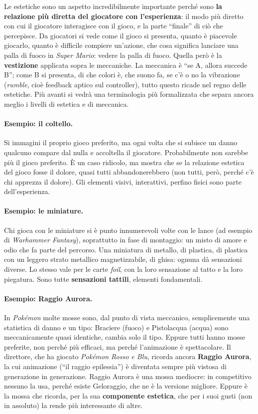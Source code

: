 Le estetiche sono un aspetto incredibilmente importante perché sono
\textbf{la relazione più diretta del giocatore con l'esperienza}: il modo più
diretto con cui il giocatore interagisce con il gioco, e la parte ``finale'' di
ciò che percepisce. Da giocatori si vede come il gioco si presenta, quanto è
piacevole giocarlo, quanto è difficile compiere un'azione, che cosa significa
lanciare una palla di fuoco in \emph{Super Mario}: vedere la palla di fuoco.
Quella però è la \textbf{vestizione} applicata sopra le meccaniche. La
meccanica è ``se A, allora succede B''; come B si presenta, di che colori è,
che suono fa, se c'è o no la vibrazione (\emph{rumble}, cioè feedback aptico
sul controller), tutto questo ricade nel regno delle estetiche. Più avanti si
vedrà una terminologia più formalizzata che separa ancora meglio i livelli di
estetica e di meccanica.

\paragraph{Esempio: il coltello.} Si immagini il proprio gioco preferito, ma
ogni volta che si subisce un danno qualcuno compare dal nulla e accoltella il
giocatore. Probabilmente non sarebbe più il gioco preferito. È un caso
ridicolo, ma mostra che se la relazione estetica del gioco fosse il dolore,
quasi tutti abbandonerebbero (non tutti, però, perché c'è chi apprezza il
dolore). Gli elementi visivi, interattivi, perfino fisici sono parte
dell'esperienza.

\paragraph{Esempio: le miniature.} Chi gioca con le miniature si è punto
innumerevoli volte con le lance (ad esempio di \emph{Warhammer Fantasy}),
soprattutto in fase di montaggio: un misto di amore e odio che fa parte del
percorso. Una miniatura di metallo, di plastica, di plastica con un leggero
strato metallico magnetizzabile, di ghisa: ognuna dà sensazioni diverse.
Lo stesso vale per le carte \emph{foil}, con la loro sensazione al tatto e la
loro piegatura. Sono tutte \textbf{sensazioni tattili}, elementi fondamentali.

\paragraph{Esempio: Raggio Aurora.} In \emph{Pokémon} molte mosse sono, dal
punto di vista meccanico, semplicemente una statistica di danno e un tipo:
Braciere (fuoco) e Pistolacqua (acqua) sono meccanicamente quasi identiche,
cambia solo il tipo. Eppure tutti hanno mosse preferite, non perché più
efficaci, ma perché l'animazione è spettacolare. Il direttore, che ha giocato
\emph{Pokémon Rosso e Blu}, ricorda ancora \textbf{Raggio Aurora}, la cui
animazione (``il raggio epilessia'') è diventata sempre più vistosa di
generazione in generazione. Raggio Aurora è una mossa mediocre: in competitivo
nessuno la usa, perché esiste Geloraggio, che ne è la versione migliore.
Eppure è la mossa che ricorda, per la sua \textbf{componente estetica}, che per
i suoi gusti (non in assoluto) la rende più interessante di altre.

